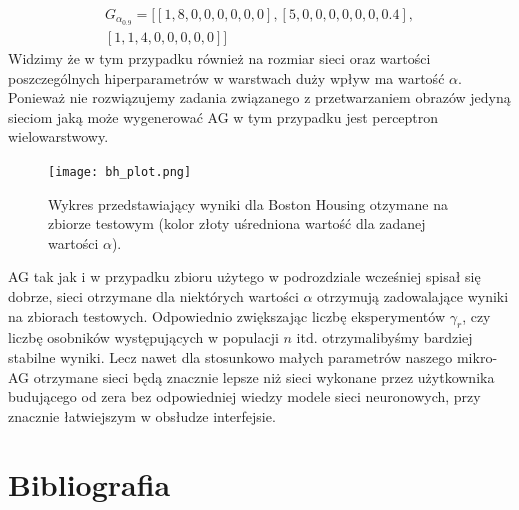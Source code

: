 \documentclass{article}
\begin{document}
\begin{align*}
	G_{\alpha_{0.9}} = \big[[1, 8, 0, 0, 0, 0, 0, 0], [5, 0, 0, 0, 0, 0, 0, 0.4],\\
	                       [1, 1, 4, 0, 0, 0, 0, 0]\big]
\end{align*}
Widzimy że w tym przypadku również na rozmiar sieci oraz wartości
poszczególnych hiperparametrów w warstwach duży wpływ ma wartość $\alpha$.
Ponieważ nie rozwiązujemy zadania związanego z przetwarzaniem obrazów jedyną sieciom 
jaką może wygenerować AG w tym przypadku jest perceptron wielowarstwowy.

\begin{figure}[H]
\centering
\texttt{[image: bh\_plot.png]}
\caption{Wykres przedstawiający wyniki dla Boston Housing otzymane na zbiorze testowym
(kolor złoty uśredniona wartość dla zadanej wartości $\alpha$).}
\end{figure}

AG tak jak i w przypadku zbioru użytego w podrozdziale wcześniej spisał się dobrze,
sieci otrzymane dla niektórych wartości $\alpha$ otrzymują zadowalające wyniki na zbiorach
testowych. Odpowiednio zwiększając liczbę eksperymentów $\gamma_r$, czy liczbę 
osobników występujących w populacji $n$ itd. otrzymalibyśmy bardziej
stabilne wyniki. Lecz nawet dla stosunkowo małych parametrów naszego mikro-AG otrzymane
sieci będą znacznie lepsze niż sieci wykonane przez użytkownika budującego od zera bez odpowiedniej wiedzy modele sieci neuronowych, przy znacznie łatwiejszym w obsłudze interfejsie.\\
\section{Bibliografia}
\printbibliography
\end{document}
